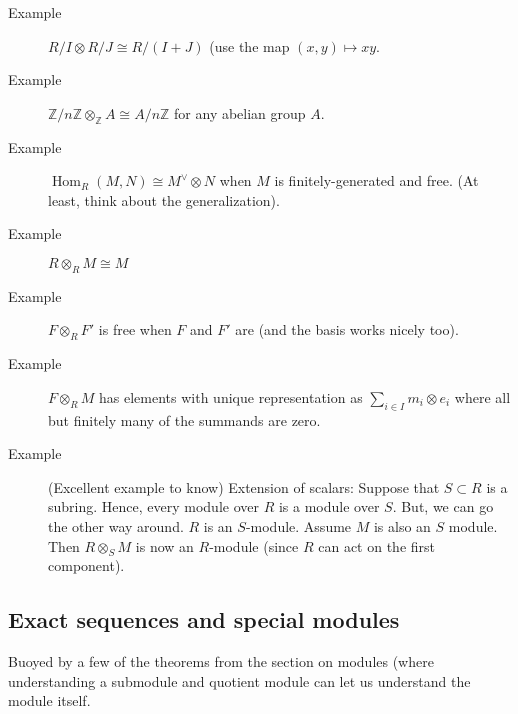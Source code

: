 \documentclass[12pt]{article}
\newcommand{\bbZ}{\mathbb{Z}}
\newcommand{\Hom}{\operatorname{Hom}}
\begin{document}
\begin{description}
\item[Example] $R/I\otimes R/J \cong R/(I+J)$ (use the map
  $(x,y)\mapsto xy$. 
\item[Example] $\bbZ/n\bbZ \otimes_\bbZ A \cong A/n\bbZ$ for any
  abelian group $A$. 
\item[Example] $\Hom_R(M,N) \cong M^\vee \otimes N$ when $M$ is
  finitely-generated and free. (At least, think about the
  generalization). 
\item[Example] $R\otimes_R M \cong M$
\item[Example] $F\otimes_R F'$ is free when $F$ and $F'$ are (and the
  basis works nicely too). 
\item[Example] $F\otimes_R M$ has elements with unique representation
  as $\sum_{i\in I} m_i \otimes e_i$ where all but finitely many of
  the summands are zero. 
\item[Example] (Excellent example to know) Extension of scalars:
  Suppose that $S\subset R$ is a subring. Hence, every module over $R$
  is a module over $S$. But, we can go the other way around. $R$ is an
  $S$-module. Assume $M$ is also an $S$ module. Then $R\otimes_S M$ is
  now an $R$-module (since $R$ can act on the first component). 




\end{description}
\subsection{Exact sequences and special modules}
\label{sec:exact-sequ-spec-1}

Buoyed by a few of the theorems from the section on modules (where
understanding a submodule and quotient module can let us understand
the module itself. 
\end{document}
